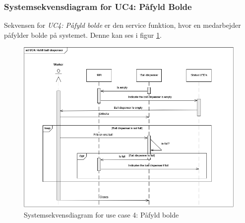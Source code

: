 \documentclass[Rapport/Rapport_main.tex]{subfiles}
\begin{document}
\subsubsection{Systemsekvensdiagram for UC4: Påfyld Bolde}
Sekvensen for \textit{UC4: Påfyld bolde} er den service funktion, hvor en medarbejder påfylder bolde på systemet. Denne kan ses i figur \ref{fig:rap_sd_UC4}.
\begin{figure}[H]
    \centering
    \includegraphics[scale=0.9]{Arkitektur/Sekvensdiagrammer/graphics/sd_UC4.png}
    \caption{Systemsekvensdiagram for use case 4: Påfyld bolde}
    \label{fig:rap_sd_UC4}
\end{figure}
\end{document}
